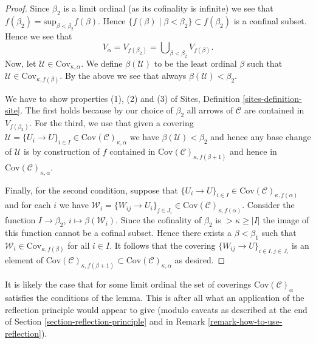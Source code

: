 \begin{proof}
\medskip\noindent
Since $\beta_2$ is a limit ordinal (as its cofinality is infinite)
we see that $f(\beta_2) = \text{sup}_{\beta < \beta_2} f(\beta)$.
Hence $\{f(\beta) \mid \beta < \beta_2\} \subset f(\beta_2)$ is a
confinal subset. Hence we see that
$$
V_\alpha = V_{f(\beta_2)} = \bigcup\nolimits_{\beta < \beta_2} V_{f(\beta)}.
$$
Now, let $\mathcal{U} \in \text{Cov}_{\kappa, \alpha}$.
We define $\beta(\mathcal{U})$ to be the least ordinal $\beta$ such that
$\mathcal{U} \in \text{Cov}_{\kappa, f(\beta)}$. By the above we see
that always $\beta(\mathcal{U}) < \beta_2$.

\medskip\noindent
We have to show properties (1), (2) and (3) of
Sites, Definition \ref{sites-definition-site}.
The first holds because by our choice of $\beta_2$ 
all arrows of $\mathcal{C}$ are contained in $V_{f(\beta_2)}$.
For the third, we use that given a covering
$\mathcal{U} = \{U_i \to U\}_{i \in I}
\in \text{Cov}(\mathcal{C})_{\kappa, \alpha}$
we have $\beta(\mathcal{U}) < \beta_2$ and hence
any base change of $\mathcal{U}$ is by construction of
$f$ contained in $\text{Cov}(\mathcal{C})_{\kappa, f(\beta + 1)}$
and hence in $\text{Cov}(\mathcal{C})_{\kappa, \alpha}$.

\medskip\noindent
Finally, for the second condition, suppose that $\{U_i \to U\}_{i\in I}
\in \text{Cov}(\mathcal{C})_{\kappa, f(\alpha)}$
and for each $i$ we have
$\mathcal{W}_i = \{W_{ij} \to U_i\}_{j\in J_i}
\in \text{Cov}(\mathcal{C})_{\kappa, f(\alpha)}$.
Consider the function
$I \to \beta_2$, $i \mapsto \beta(\mathcal{W}_i)$. Since the cofinality
of $\beta_2$ is $> \kappa \geq |I|$ the image of this function cannot be a
cofinal subset. Hence there exists a $\beta < \beta_1$ such
that $\mathcal{W}_i \in \text{Cov}_{\kappa, f(\beta)}$ for all $i \in I$.
It follows that the covering $\{W_{ij} \to U\}_{i\in I, j \in J_i}$
is an element of $\text{Cov}(\mathcal{C})_{\kappa, f(\beta + 1)}
\subset \text{Cov}(\mathcal{C})_{\kappa, \alpha}$ as desired.
\end{proof}

\begin{remark}
\label{remark-better}
It is likely the case that for some limit ordinal
the set of coverings $\text{Cov}(\mathcal{C})_\alpha$ satisfies
the conditions of the lemma. This is after all what an application
of the reflection principle would appear to give (modulo caveats as
described at the end of Section \ref{section-reflection-principle}
and in Remark \ref{remark-how-to-use-reflection}).
\end{remark}







